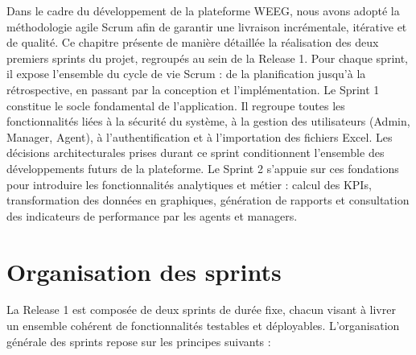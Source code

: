 \documentclass[a4paper,12pt]{report}
\begin{document}
Dans le cadre du développement de la plateforme WEEG, nous avons adopté la méthodologie agile Scrum afin de garantir une livraison incrémentale, itérative et de qualité. Ce chapitre présente de manière détaillée la réalisation des deux premiers sprints du projet, regroupés au sein de la Release 1. Pour chaque sprint, il expose l'ensemble du cycle de vie Scrum : de la planification jusqu'à la rétrospective, en passant par la conception et l'implémentation.
Le Sprint 1 constitue le socle fondamental de l'application. Il regroupe toutes les fonctionnalités liées à la sécurité du système, à la gestion des utilisateurs (Admin, Manager, Agent), à l'authentification et à l'importation des fichiers Excel. Les décisions architecturales prises durant ce sprint conditionnent l'ensemble des développements futurs de la plateforme.
Le Sprint 2 s'appuie sur ces fondations pour introduire les fonctionnalités analytiques et métier : calcul des KPIs, transformation des données en graphiques, génération de rapports et consultation des indicateurs de performance par les agents et managers.

\section{Organisation des sprints}

La Release 1 est composée de deux sprints de durée fixe, chacun visant à livrer un ensemble cohérent de fonctionnalités testables et déployables. L'organisation générale des sprints repose sur les principes suivants :
\end{document}
